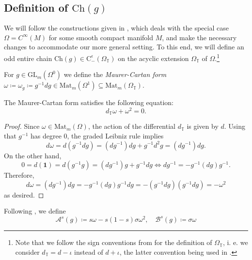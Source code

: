 \documentclass[a4paper, english, 12pt, bibliography=totocnumbered,
index=totoc]{scrartcl}
\begin{document}
\subsection{Definition of
	\texorpdfstring{$\mathrm{Ch}(g)$}{Ch(g)}}\label{Section: definition cherng}
We will follow the constructions given in \cite[Section 5]{GüneysuCacciatori},
which deals with the special case $\Omega = C^{\infty}(M)$ for some smooth
compact manifold $M$, and make the necessary changes to accommodate our more
general setting.
To this end, we will define an odd entire chain $\mathrm{Ch}(g) \in
\mathrm{C}^{\epsilon}_{-}(\Omega_{\mathbb{T}})$ on the acyclic extension
$\Omega_{\mathbb{T}}$ of $\Omega$.\footnote{Note that we follow the sign
	conventions from \cite[Eq. (2.7)]{GüneysuLudewig} for the definition of
	$\Omega_{\mathbb{T}}$, i. e. we
	consider $d_{\mathbb{T}} = d - \iota$ instead of $d + \iota$, the latter
	convention being used in \cite[Section 3]{GüneysuCacciatori}.}
\begin{defn}
	For $g \in \mathrm{GL}_m(\Omega^0)$ we define the \textit{Maurer-Cartan
		form} $\omega \coloneqq \omega_{g} \coloneqq g^{-1} dg \in
	\mathrm{Mat}_m(\Omega^1) \subseteq
	\mathrm{Mat}_m(\Omega_{\mathbb{T}})$.
\end{defn}
\begin{lem}
	The Maurer-Cartan form satisfies the following equation:
	\begin{equation*}
		d_{\mathbb{T}}\omega + \omega^2 = 0.
	\end{equation*}
\end{lem}
\begin{proof}
	Since $\omega \in \mathrm{Mat}_m(\Omega)$, the action of the
	differential $d_{\mathbb{T}}$ is given by $d$.
	Using that $g^{-1}$ has degree $0$, the graded Leibniz rule implies
	\begin{equation*}
		d \omega = d(g^{-1}dg) = (dg^{-1})dg + g^{-1}d^2 g = (dg^{-1})dg.
	\end{equation*}
	On the other hand,
	\begin{equation}\label{dg^-1}
		0 = d(\mathbf{1}) = d(g^{-1}g) = (dg^{-1})g + g^{-1}dg \iff dg^{-1} =
		-g^{-1}(dg)g^{-1}.
	\end{equation}
	Therefore,
	\begin{equation*}
		d \omega = (dg^{-1})dg = -g^{-1}(dg)g^{-1}dg = -(g^{-1}dg)(g^{-1}dg) =
		-\omega^2
	\end{equation*}
	as desired.
\end{proof}
Following \cite[Eq. (24)]{GüneysuCacciatori}, we define
\begin{equation*}
	\mathcal{A}^s(g) \coloneqq s \omega - s(1-s)\sigma \omega^2, \quad
	\mathcal{B}^s(g) \coloneqq \sigma \omega
\end{equation*}
\end{document}
